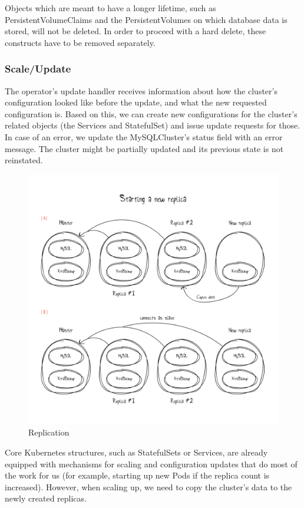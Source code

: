 Objects which are meant to have a longer lifetime, such as PersistentVolumeClaims and the
PersistentVolumes on which database data is stored, will not be deleted. In order to
proceed with a hard delete, these constructs have to be removed separately.

\subsubsection*{Scale/Update}
The operator's update handler receives information about how the cluster's configuration looked
like before the update, and what the new requested configuration is. Based on this, we can create
new configurations for the cluster's related objects (the Services and StatefulSet) and issue update
requests for those. In case of an error, we update the MySQLCluster's status field with an error
message. The cluster might be partially updated and its previous state is not reinstated.

\begin{figure}[!ht]
    \centering
    \includegraphics[width=1\textwidth, angle=0]{img/Replication.pdf}
    \caption{Replication}
    \label{fig:replication}
\end{figure}

Core Kubernetes structures, such as StatefulSets or Services, are already equipped with mechanisms
for scaling and configuration updates that do most of the work for us (for example, starting up new
Pods if the replica count is increased). However, when scaling up, we need to copy the cluster's
data to the newly created replicas.

